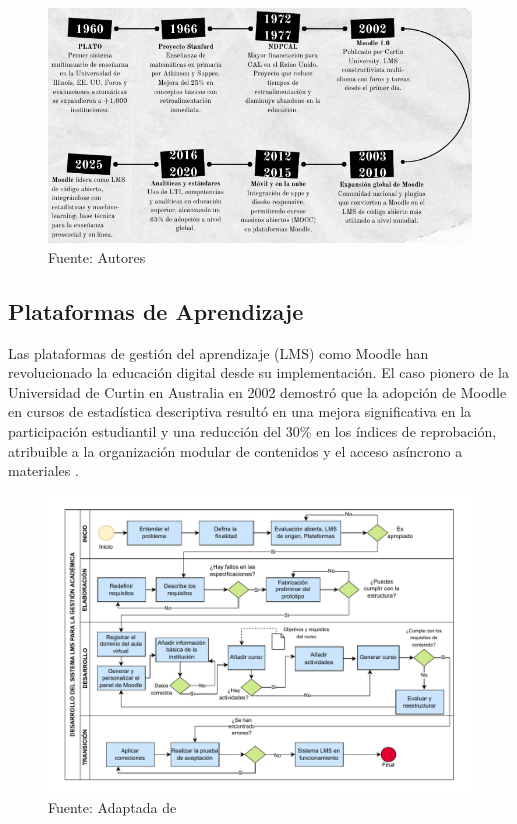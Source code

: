 \documentclass[letter,oneside,12pt,spanish]{report}
\begin{document}
\begin{figure}[ht]
	\centering
	\includegraphics[width=1\textwidth]{Figs/Linea del Tiempo.png}
	\label{fig:LuisaArquitectura}
	\\Fuente: Autores
\end{figure}

\subsection{Plataformas de Aprendizaje}
Las plataformas de gestión del aprendizaje (LMS) como Moodle han revolucionado la educación digital desde su implementación. El caso pionero de la Universidad de Curtin en Australia en 2002 demostró que la adopción de Moodle en cursos de estadística descriptiva resultó en una mejora significativa en la participación estudiantil y una reducción del 30\% en los índices de reprobación, atribuible a la organización modular de contenidos y el acceso asíncrono a materiales \parencite{Pacheco2025}.
\begin{figure}[ht]
    \centering
    \includegraphics[width=1\textwidth]{Figs/LMS.pdf}
    \label{fig:LMS}
    \\Fuente: Adaptada de \textcite{Pacheco2025}
\end{figure}
\end{document}
